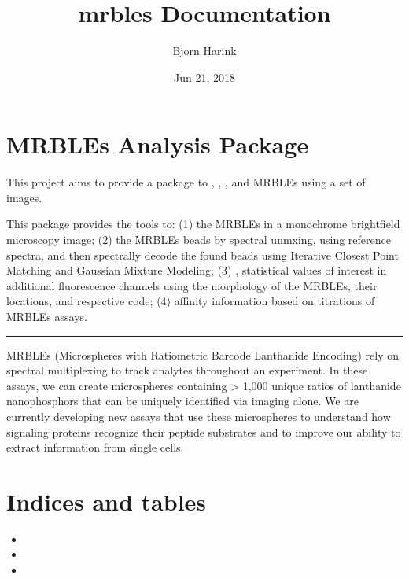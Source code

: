 \documentclass[letterpaper,10pt,english]{sphinxmanual}
\title{mrbles Documentation}
\date{Jun 21, 2018}
\author{Bjorn Harink}
\begin{document}
\maketitle
\sphinxtableofcontents
{}\label{\detokenize{index::doc}}



\chapter{MRBLEs Analysis Package}
\label{\detokenize{readme:mrbles-analysis-package}}\label{\detokenize{readme::doc}}
This project aims to provide a package to , , ,
 and MRBLEs using a set of images.

This package provides the tools to: (1)  the MRBLEs in a monochrome
brightfield microscopy image; (2)  the MRBLEs beads by spectral
unmxing, using reference spectra, and then spectrally decode the found beads
using Iterative Closest Point Matching and Gaussian Mixture Modeling; (3)
, statistical values of interest in additional fluorescence
channels using the morphology of the MRBLEs, their locations, and respective
code; (4)  affinity information based on titrations of MRBLEs
assays.


\bigskip\hrule\bigskip


MRBLEs (Microspheres with Ratiometric Barcode Lanthanide Encoding) rely on
spectral multiplexing to track analytes throughout an experiment. In these
assays, we can create microspheres containing \textgreater{} 1,000 unique ratios of
lanthanide nanophosphors that can be uniquely identified via imaging alone.
We are currently developing new assays that use these microspheres to
understand how signaling proteins recognize their peptide substrates and to
improve our ability to extract information from single cells.


\chapter{Indices and tables}
\label{\detokenize{index:indices-and-tables}}\begin{itemize}
\item {} 

\item {} 

\item {} 

\end{itemize}



\renewcommand{\indexname}{Index}
\printindex
\end{document}
